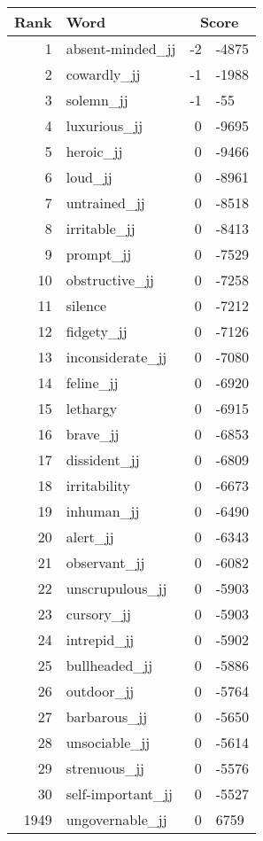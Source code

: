 \begin{longtable}[!htbp]{| rlr@{.}l |}
    \hline
    \textbf{Rank} & \textbf{Word} & \multicolumn{2}{c|}{\textbf{Score}} \\
    \hline
    \endhead
    1 & absent-minded\_jj & -2 & -4875 \\
    2 & cowardly\_jj & -1 & -1988 \\
    3 & solemn\_jj & -1 & -55 \\
    4 & luxurious\_jj & 0 & -9695 \\
    5 & heroic\_jj & 0 & -9466 \\
    6 & loud\_jj & 0 & -8961 \\
    7 & untrained\_jj & 0 & -8518 \\
    8 & irritable\_jj & 0 & -8413 \\
    9 & prompt\_jj & 0 & -7529 \\
    10 & obstructive\_jj & 0 & -7258 \\
    11 & silence & 0 & -7212 \\
    12 & fidgety\_jj & 0 & -7126 \\
    13 & inconsiderate\_jj & 0 & -7080 \\
    14 & feline\_jj & 0 & -6920 \\
    15 & lethargy & 0 & -6915 \\
    16 & brave\_jj & 0 & -6853 \\
    17 & dissident\_jj & 0 & -6809 \\
    18 & irritability & 0 & -6673 \\
    19 & inhuman\_jj & 0 & -6490 \\
    20 & alert\_jj & 0 & -6343 \\
    21 & observant\_jj & 0 & -6082 \\
    22 & unscrupulous\_jj & 0 & -5903 \\
    23 & cursory\_jj & 0 & -5903 \\
    24 & intrepid\_jj & 0 & -5902 \\
    25 & bullheaded\_jj & 0 & -5886 \\
    26 & outdoor\_jj & 0 & -5764 \\
    27 & barbarous\_jj & 0 & -5650 \\
    28 & unsociable\_jj & 0 & -5614 \\
    29 & strenuous\_jj & 0 & -5576 \\
    30 & self-important\_jj & 0 & -5527 \\
    1949 & ungovernable\_jj & 0 & 6759 \\

\end{longtable}
